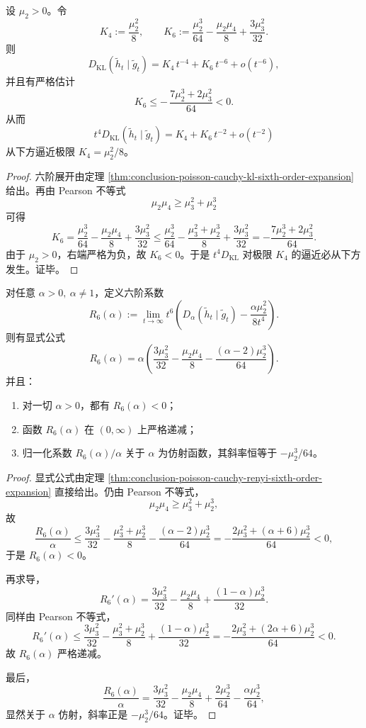 \begin{theorem}[KL 六阶校正项的严格负性与单侧逼近律]\label{thm:conclusion-poisson-cauchy-kl-sixth-negative-one-sided-approach}
设 \(\mu_2>0\)。令
\[
K_4:=\frac{\mu_2^2}{8},
\qquad
K_6:=\frac{\mu_2^3}{64}-\frac{\mu_2\mu_4}{8}+\frac{3\mu_3^2}{32}.
\]
则
\[
D_{\mathrm{KL}}(\tilde h_t\mid \tilde g_t)=K_4\,t^{-4}+K_6\,t^{-6}+o(t^{-6}),
\]
并且有严格估计
\[
K_6\le -\,\frac{7\mu_2^3+2\mu_3^2}{64}<0.
\]
从而
\[
t^4D_{\mathrm{KL}}(\tilde h_t\mid \tilde g_t)
=
K_4+K_6\,t^{-2}+o(t^{-2})
\]
从下方逼近极限 \(K_4=\mu_2^2/8\)。
\end{theorem}
\begin{proof}
六阶展开由定理 \ref{thm:conclusion-poisson-cauchy-kl-sixth-order-expansion} 给出。再由 Pearson 不等式
\[
\mu_2\mu_4\ge \mu_3^2+\mu_2^3
\]
可得
\[
K_6
=
\frac{\mu_2^3}{64}-\frac{\mu_2\mu_4}{8}+\frac{3\mu_3^2}{32}
\le
\frac{\mu_2^3}{64}-\frac{\mu_3^2+\mu_2^3}{8}+\frac{3\mu_3^2}{32}
=
-\frac{7\mu_2^3+2\mu_3^2}{64}.
\]
由于 \(\mu_2>0\)，右端严格为负，故 \(K_6<0\)。于是 \(t^4D_{\mathrm{KL}}\) 对极限 \(K_4\) 的逼近必从下方发生。证毕。
\end{proof}

\begin{theorem}\label{thm:conclusion-poisson-cauchy-renyi-sixth-negative-monotone}
对任意 \(\alpha>0,\ \alpha\neq 1\)，定义六阶系数
\[
R_6(\alpha):=
\lim_{t\to\infty}
t^6\left(
D_\alpha(\tilde h_t\mid \tilde g_t)-\frac{\alpha\mu_2^2}{8t^4}
\right).
\]
则有显式公式
\[
R_6(\alpha)
=
\alpha\left(
\frac{3\mu_3^2}{32}-\frac{\mu_2\mu_4}{8}
-\frac{(\alpha-2)\mu_2^3}{64}
\right).
\]
并且：
\begin{enumerate}
\item 对一切 \(\alpha>0\)，都有 \(R_6(\alpha)<0\)；
\item 函数 \(R_6(\alpha)\) 在 \((0,\infty)\) 上严格递减；
\item 归一化系数 \(R_6(\alpha)/\alpha\) 关于 \(\alpha\) 为仿射函数，其斜率恒等于 \(-\mu_2^3/64\)。
\end{enumerate}
\end{theorem}
\begin{proof}
显式公式由定理 \ref{thm:conclusion-poisson-cauchy-renyi-sixth-order-expansion} 直接给出。仍由 Pearson 不等式，
\[
\mu_2\mu_4\ge \mu_3^2+\mu_2^3,
\]
故
\[
\frac{R_6(\alpha)}{\alpha}
\le
\frac{3\mu_3^2}{32}-\frac{\mu_3^2+\mu_2^3}{8}-\frac{(\alpha-2)\mu_2^3}{64}
=
-\frac{2\mu_3^2+(\alpha+6)\mu_2^3}{64}<0,
\]
于是 \(R_6(\alpha)<0\)。

再求导，
\[
R_6'(\alpha)
=
\frac{3\mu_3^2}{32}-\frac{\mu_2\mu_4}{8}+\frac{(1-\alpha)\mu_2^3}{32}.
\]
同样由 Pearson 不等式，
\[
R_6'(\alpha)
\le
\frac{3\mu_3^2}{32}-\frac{\mu_3^2+\mu_2^3}{8}+\frac{(1-\alpha)\mu_2^3}{32}
=
-\frac{2\mu_3^2+(2\alpha+6)\mu_2^3}{64}<0.
\]
故 \(R_6(\alpha)\) 严格递减。

最后，
\[
\frac{R_6(\alpha)}{\alpha}
=
\frac{3\mu_3^2}{32}-\frac{\mu_2\mu_4}{8}
+\frac{2\mu_2^3}{64}
-\frac{\alpha\mu_2^3}{64},
\]
显然关于 \(\alpha\) 仿射，斜率正是 \(-\mu_2^3/64\)。证毕。
\end{proof}

